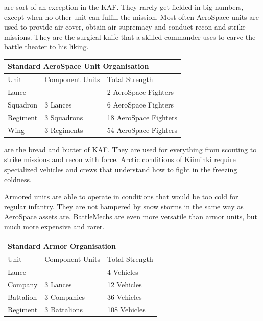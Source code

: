 \documentclass{tufte-book}
\begin{document}
 are sort of an exception in the KAF. 
They rarely get fielded in big numbers, except when no other unit can
fulfill the mission. Most often AeroSpace units are used to provide air
cover, obtain air supremacy and conduct recon and strike missions. They
are the surgical knife that a skilled commander uses to carve the battle
theater to his liking.

\bigskip
\begin{minipage}{\textwidth}
\begin{center}
\begin{tabular}{lll}
\toprule
\multicolumn{3}{l}{Standard AeroSpace Unit Organisation} \\
\midrule
Unit & Component Units & Total Strength \\
\midrule
Lance    & -           & 2 AeroSpace Fighters \\
Squadron & 3 Lances    & 6 AeroSpace Fighters \\
Regiment & 3 Squadrons & 18 AeroSpace Fighters \\
Wing     & 3 Regiments & 54 AeroSpace Fighters \\
\bottomrule
\end{tabular}
\end{center}
\end{minipage}

 are the bread and butter of KAF. 
They are used for everything from scouting to strike missions and recon 
with force. Arctic conditions of Kiiminki require specialized vehicles 
and crews that understand how to fight in the freezing coldness.

Armored units are able to operate in conditions that would be too cold
for regular infantry. They are not hampered by snow storms in the same
way as AeroSpace assets are. BattleMechs are even more versatile than
armor units, but much more expensive and rarer.

\bigskip
\begin{minipage}{\textwidth}
\begin{center}
\begin{tabular}{lll}
\toprule
\multicolumn{3}{l}{Standard Armor Organisation} \\
\midrule
Unit & Component Units & Total Strength \\
\midrule
Lance     & -            & 4 Vehicles \\
Company   & 3 Lances     & 12 Vehicles \\
Battalion & 3 Companies  & 36 Vehicles \\
Regiment  & 3 Battalions & 108 Vehicles \\
\bottomrule
\end{tabular}
\end{center}
\end{minipage}
\end{document}
